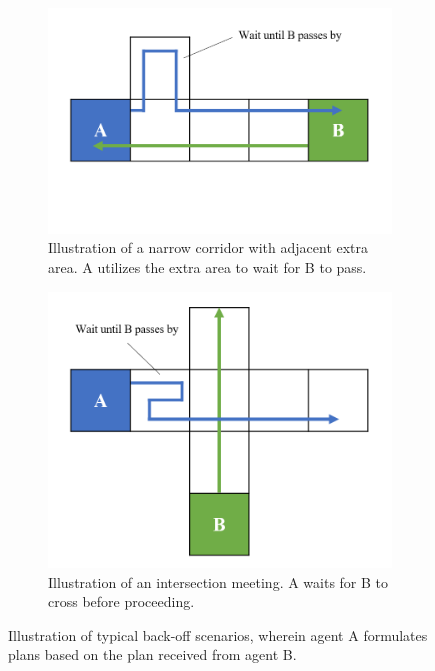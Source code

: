 \begin{figure}[htbp]
    \begin{subfigure}[t]{0.45\linewidth}
        \centering
        \includegraphics[width=\linewidth]{figures/Retreat1.png}
        \caption{Illustration of a narrow corridor with adjacent extra area. A utilizes the extra area to wait for B to pass.} %
        \label{fig:retreat1}
    \end{subfigure}
    \hfill
    \begin{subfigure}[t]{0.45\linewidth}
        \centering
        \includegraphics[width=\linewidth]{figures/Retreat2.png}
        \caption{Illustration of an intersection meeting. A waits for B to cross before proceeding.}%
        \label{fig:retreat2}
    \end{subfigure}
    \caption{Illustration of typical back-off scenarios, wherein agent A formulates plans based on the plan received from agent B.}%
    \label{fig:retreat}
\end{figure}
\FloatBarrier

